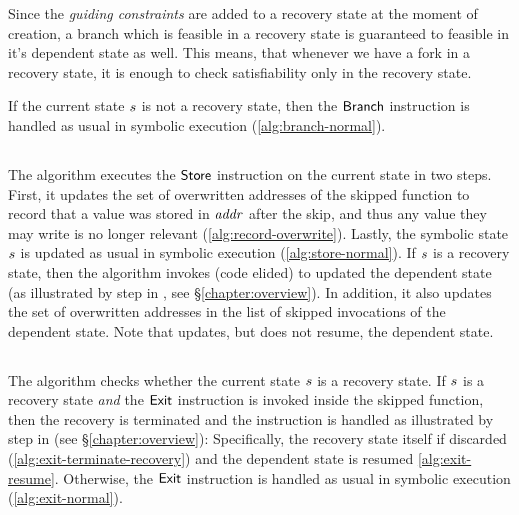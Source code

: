 Since the \textit{guiding constraints} are added to a recovery state at the moment of creation,
a branch which is feasible in a recovery state is guaranteed to feasible in it's dependent state as well.
This means, that whenever we have a fork in a recovery state,
it is enough to check satisfiability only in the recovery state.

If the current state $s$ is not a recovery
state, then the $\mathsf{Branch}$ instruction is handled as usual in
symbolic execution (\cref{alg:branch-normal}).

\subsection{}

The algorithm executes the $\mathsf{Store}$ instruction on the
current state in two steps. First, it updates the set of overwritten
addresses of the skipped function to record that a value was stored in
$\mathit{addr}$ after the skip, and thus any value they may write is no longer
relevant (\cref{alg:record-overwrite}). Lastly, the symbolic state
$s$ is updated as usual in symbolic execution
(\cref{alg:store-normal}). If $s$ is a recovery state, then
the algorithm invokes
 (code elided) to
updated the dependent state (as illustrated by step  in
, see \S\ref{chapter:overview}). In addition, it also
updates the set of overwritten addresses in the list of skipped
invocations of the dependent state. Note that
 updates, but
does not resume, the dependent state.

\subsection{}

The algorithm checks whether the current state $s$ is a
recovery state. If $s$ is a recovery state \emph{and} the
$\mathsf{Exit}$ instruction is invoked inside the skipped function,
then the recovery is terminated and the instruction is handled as
illustrated by step  in  (see
\S\ref{chapter:overview}): Specifically, the recovery state itself if
discarded (\cref{alg:exit-terminate-recovery}) and the dependent state
is resumed \cref{alg:exit-resume}. Otherwise, the $\mathsf{Exit}$
instruction is handled as usual in symbolic execution
(\cref{alg:exit-normal}).



